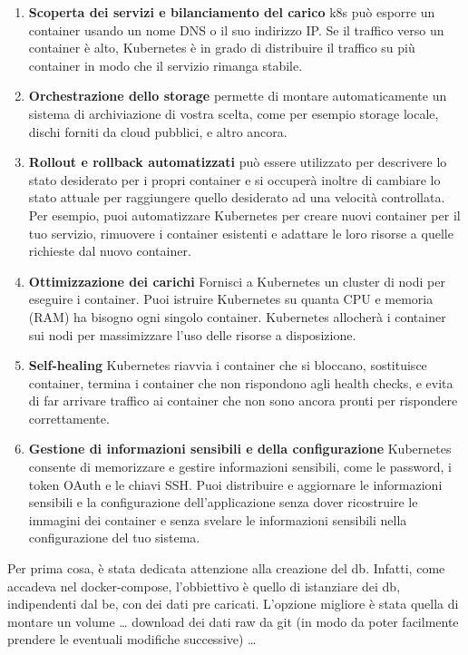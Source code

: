 \documentclass{article}
\begin{document}
\begin{enumerate} 
    \item \textbf{Scoperta dei servizi e bilanciamento del carico} k8s può esporre un container usando un nome DNS o il suo indirizzo IP. Se il traffico verso un container è alto, Kubernetes è in grado di distribuire il traffico su più container in modo che il servizio rimanga stabile.
    \item \textbf{Orchestrazione dello storage} permette di montare automaticamente un sistema di archiviazione di vostra scelta, come per esempio storage locale, dischi forniti da cloud pubblici, e altro ancora.
    \item \textbf{Rollout e rollback automatizzati} può essere utilizzato per descrivere lo stato desiderato per i propri container e si occuperà inoltre di cambiare lo stato attuale per raggiungere quello desiderato ad una velocità controllata. Per esempio, puoi automatizzare Kubernetes per creare nuovi container per il tuo servizio, rimuovere i container esistenti e adattare le loro risorse a quelle richieste dal nuovo container.
    \item \textbf{Ottimizzazione dei carichi} Fornisci a Kubernetes un cluster di nodi per eseguire i container. Puoi istruire Kubernetes su quanta CPU e memoria (RAM) ha bisogno ogni singolo container. Kubernetes allocherà i container sui nodi per massimizzare l'uso delle risorse a disposizione.
    \item \textbf{Self-healing} Kubernetes riavvia i container che si bloccano, sostituisce container, termina i container che non rispondono agli health checks, e evita di far arrivare traffico ai container che non sono ancora pronti per rispondere correttamente.
    \item \textbf{Gestione di informazioni sensibili e della configurazione} Kubernetes consente di memorizzare e gestire informazioni sensibili, come le password, i token OAuth e le chiavi SSH. Puoi distribuire e aggiornare le informazioni sensibili e la configurazione dell'applicazione senza dover ricostruire le immagini dei container e senza svelare le informazioni sensibili nella configurazione del tuo sistema.
\end{enumerate}


Per prima cosa, è stata dedicata attenzione alla creazione del db. Infatti, come accadeva nel docker-compose, l’obbiettivo è quello di istanziare dei db, indipendenti dal be, con dei dati pre caricati. L’opzione migliore è stata quella di montare un volume … download dei dati raw da git (in modo da poter facilmente prendere le eventuali modifiche successive) …
\end{document}
